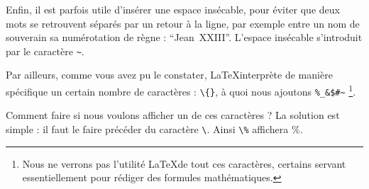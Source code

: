 Enfin, il est parfois utile d'insérer une espace insécable, pour éviter que deux mots se retrouvent séparés par un retour à la ligne, par exemple entre un nom de souverain sa numérotation de règne : \enquote{Jean~XXIII}.  L'espace insécable s'introduit par le caractère \verb|~|.












Par ailleurs, comme vous avez pu le constater, \LaTeX interprète de manière spécifique un certain nombre de caractères : \verb|\{}|, à quoi nous ajoutons \verb|%_&$#~| \footnote{Nous ne verrons pas l'utilité \LaTeX  de tout ces caractères, certains servant essentiellement pour rédiger des formules mathématiques.}.

Comment faire si nous voulons afficher un de ces caractères ? La solution est simple : il faut le faire précéder du caractère \verb|\|. Ainsi \verb|\%| affichera \%.   





